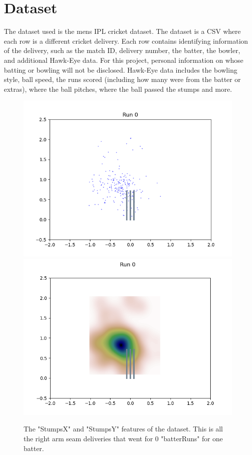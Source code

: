 \documentclass[12pt,a4paper]{report}
\theoremstyle{definition}
\begin{document}
\section{Dataset} \label{sec:Dataset}

The dataset used is the mens IPL cricket dataset. 
The dataset is a CSV where each row is a different cricket delivery. 
Each row contains identifying information of the delivery, such as the match ID, delivery number, the batter, the bowler, and additional Hawk-Eye data.
For this project, personal information on whose batting or bowling will not be disclosed. 
Hawk-Eye data includes the bowling style, ball speed, the runs scored (including how many were from the batter or extras), where the ball pitches, where the ball passed the stumps and more.     

\begin{figure}[H]
    \centering
    \includegraphics[width=0.49\linewidth]{jos_buttler_0_runs_right_arm_seam_stumps.png}
    \includegraphics[width=0.49\linewidth]{jos_buttler_0_runs_right_arm_seam_stumps_heat_map.png}
    \caption{The "StumpsX" and "StumpsY" features of the dataset. This is all the right arm seam deliveries that went for 0 "batterRuns" for one batter.}
    \label{fig:StumpsXY0Runs}
\end{figure}
\end{document}
